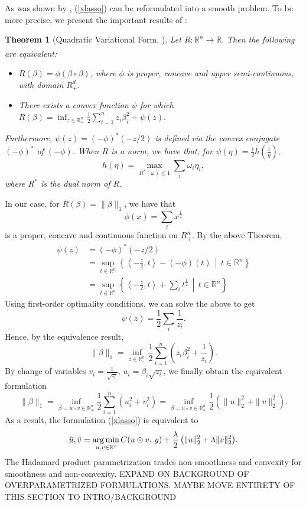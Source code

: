\documentclass{article}
\newtheorem{theorem}{Theorem}[section]
\begin{document}
As was shown by \cite{poon}, (\ref{xlasso}) can be reformulated into a smooth problem. To be more precise, we present the important results of \cite{poon}:
\begin{theorem}[Quadratic Variational Form, \cite{poon}] \label{qvf_thm}
Let $R:\mathbb{R}^n \xrightarrow[]{} \mathbb{R}.$ Then the following are equivalent:
\begin{itemize}
    \item $R(\beta) = \phi(\beta \circ \beta)$, where $\phi$ is proper, concave and upper semi-continuous, with domain $R^d_+.$
    \item There exists a convex function $\psi$ for which $R(\beta) = \inf_{z \in \mathbb{R}^n_+} \frac{1}{2} \sum_{i=1}^n z_i \beta_i^2 + \psi(z).$
\end{itemize}
Furthermore, $\psi(z) = (-\phi)^* (-z/2)$ is defined via the convex conjugate $(-\phi)^*$ of $(-\phi)$. When $R$ is a norm, we have that, for $\psi(\eta) = \frac{1}{2} h(\frac{1}{\eta}),$
\[h(\eta) = \max_{R^*(\omega) \leq 1} \sum_i \omega_i \eta_i,\]
where $R^*$ is the dual norm of $R$.
\end{theorem}
In our case, for $R(\beta) = \|\beta\|_1$, we have that 
\[\phi(x) = \sum_i x^{\frac{1}{2}}\]
is a proper, concave and continuous function on $R^n_+$. By the above Theorem,
\begin{align*}
    \psi(z) &= (-\phi)^*(-z/2) \\
            &= \sup_{t \in \mathbb{R}^n} \left\{ \left\langle -\frac{z}{2},t \right\rangle - (-\phi)(t) \, \middle| \, t\in\mathbb{R}^n\right\} \\
            &= \sup_{t \in \mathbb{R}^n} \left\{ \left\langle -\frac{z}{2},t \right\rangle + \sum_i t^{\frac{1}{2}} \, \middle| \, t\in\mathbb{R}^n\right\}
\end{align*}
Using first-order optimality conditions, we can solve the above to get
\[\psi(z) = \frac{1}{2} \sum_i \frac{1}{z_i}.\]
Hence, by the equivalence result,
\begin{equation} \label{quad_form_l1}
    \|\beta\|_1 = \inf_{z \in \mathbb{R}^n_+} \frac{1}{2} \sum_{i=1}^n  \left( z_i \beta_i^2 + \frac{1}{z_i} \right).
\end{equation}
By change of variables $v_i = \frac{1}{\sqrt{z_i}}$, $u_i = \beta_i\sqrt{z_i}$, we finally obtain the equivalent formulation
\begin{equation} \label{uv_form_l1}
    \|\beta\|_1 = \inf_{\beta = u \circ v \in \mathbb{R}^n_+} \frac{1}{2} \sum_{i=1}^n  \left( u_i^2 + v_i^2 \right) = \inf_{\beta = u \circ v \in \mathbb{R}^n_+} \frac{1}{2} \left( \|u\|_2^2 + \|v\|_2^2 \right).
\end{equation}
As a result, the formulation (\ref{xlasso}) is equivalent to 
\begin{equation} \label{inprob_poon}
    \hat{u},\hat{v} = \underset{u,v \in \mathbb{R}^{n}} {\operatorname*{arg\, min \,}}{C(u \odot v, \,y) + \frac \lambda 2 \left( \|u\|^2_2 + \lambda \|v\|^2_2 \right)}. 
\end{equation}
The Hadamard product parametrization trades non-smoothness and convexity for smoothness and non-convexity. 
EXPAND ON BACKGROUND OF OVERPARAMETRIZED FORMULATIONS. MAYBE MOVE ENTIRETY OF THIS SECTION TO INTRO/BACKGROUND
\end{document}

